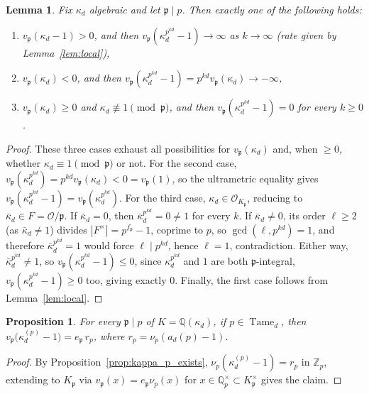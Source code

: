 \documentclass{article}
\theoremstyle{plain}
\newtheorem{lemma}[theorem]{Lemma}
\newtheorem{proposition}[theorem]{Proposition}
\theoremstyle{definition}
\theoremstyle{remark}
\newcommand{\Q}{\mathbb{Q}}
\newcommand{\Zp}{\mathbb{Z}_p}
\newcommand{\Qp}{\mathbb{Q}_p}
\DeclareMathOperator{\Tame}{Tame}
\begin{document}
\begin{lemma}\label{lem:dichotomy}
Fix $\kappa_d$ algebraic and let $\mathfrak p\mid p$. Then exactly one of the following holds:
\begin{enumerate}
\item $v_\mathfrak p(\kappa_d-1)>0$, and then $v_\mathfrak p(\kappa_d^{p^{kd}}-1)\to\infty$ as $k\to\infty$ (rate given by Lemma~\ref{lem:local}),
\item $v_\mathfrak p(\kappa_d)<0$, and then $v_\mathfrak p(\kappa_d^{p^{kd}}-1)=p^{kd}v_\mathfrak p(\kappa_d)\to-\infty$,
\item $v_\mathfrak p(\kappa_d)\ge0$ and $\kappa_d\not\equiv1\pmod{\mathfrak p}$, and then $v_\mathfrak p(\kappa_d^{p^{kd}}-1)=0$ for every $k\ge0$.
\end{enumerate}
\end{lemma}
\begin{proof}
These three cases exhaust all possibilities for $v_\mathfrak p(\kappa_d)$ and, when $\ge0$, whether $\kappa_d\equiv1\pmod{\mathfrak p}$ or not. For the second case,  $v_\mathfrak p(\kappa_d^{p^{kd}})=p^{kd}v_\mathfrak p(\kappa_d)<0=v_\mathfrak p(1)$, so the ultrametric equality gives $v_\mathfrak p(\kappa_d^{p^{kd}}-1)=v_\mathfrak p(\kappa_d^{p^{kd}})$. For the third case, $\kappa_d\in\mathcal O_{K_\mathfrak p}$, reducing to $\bar\kappa_d\in F=\mathcal O/\mathfrak p$. If $\bar\kappa_d=0$, then $\bar\kappa_d^{p^{kd}}=0\ne1$ for every $k$. If $\bar\kappa_d\ne0$, its order $\ell\ge2$ (as $\bar\kappa_d\ne1$) divides $|F^\times|=p^{f_\mathfrak p}-1$, coprime to $p$, so $\gcd(\ell,p^{kd})=1$, and therefore $\bar\kappa_d^{p^{kd}}=1$ would force $\ell\mid p^{kd}$, hence $\ell=1$, contradiction. Either way, $\bar\kappa_d^{p^{kd}}\ne1$, so $v_\mathfrak p(\kappa_d^{p^{kd}}-1)\le0$, since $\kappa_d^{p^{kd}}$ and $1$ are both $\mathfrak p$-integral, $v_\mathfrak p(\kappa_d^{p^{kd}}-1)\ge0$ too, giving exactly $0$. Finally, the first case follows from Lemma~\ref{lem:local}.
\end{proof}

\begin{proposition}\label{prop:ANppinned}
For every $\mathfrak p\mid p$ of $K=\Q(\kappa_d)$, if $p\in\Tame_d$, then $v_\mathfrak p\big(\kappa_d^{(p)}-1\big)=e_\mathfrak p\,r_p$, where $r_p=\nu_p(a_d(p)-1)$.
\end{proposition}
\begin{proof}
By Proposition~\ref{prop:kappa_p_exists}, $\nu_p(\kappa_d^{(p)}-1)=r_p$ in $\Zp$, extending to $K_\mathfrak p$ via $v_\mathfrak p(x)=e_\mathfrak p\nu_p(x)$ for $x\in\Qp^\times\subset K_\mathfrak p^\times$ gives the claim.
\end{proof}
\end{document}
